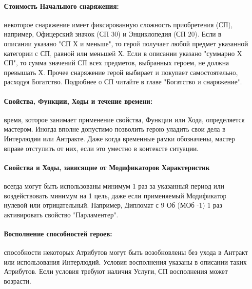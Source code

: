 \paragraph{Стоимость Начального снаряжения:} некоторое снаряжение имеет фиксированную сложность приобретения (СП), например, Офицерский значок (СП 30) и Энциклопедия (СП 20). Если в описании указано "СП Х и меньше", то герой получает любой предмет указанной категории с СП, равной или меньшей Х. Если в описании указано "суммарно Х СП", то сумма значений СП всех предметов, выбранных героем, не должна превышать Х. Прочее снаряжение герой выбирает и покупает самостоятельно, расходуя Богатство.
\newline Подробнее о СП читайте в главе "Богатство и снаряжение".
\paragraph{Свойства, Функции, Ходы и течение времени:} время, которое занимает применение свойства, Функции или Хода, определяется мастером. Иногда вполне допустимо позволить герою уладить свои дела в Интерлюдии или Антракте. Даже когда временные рамки обозначены, мастер вправе отступить от них, если это уместно в контексте ситуации.
\paragraph{Свойства и Ходы, зависящие от Модификаторов Характеристик} всегда могут быть использованы минимум 1 раз за указанный период или воздействовать минимум на 1 цель, даже если применяемый Модификатор нулевой или отрицательный. Например, Дипломат с 9 Об (МОб -1) 1 раз активировать свойство "Парламентер".
\paragraph{Восполнение способностей героев:} способности некоторых Атрибутов могут быть возобновлены без ухода в Антракт или использования Интерлюдий. Условия восполнения указаны в описании таких Атрибутов. Если условия требуют наличия Услуги, СП восполнения может возрасти.
